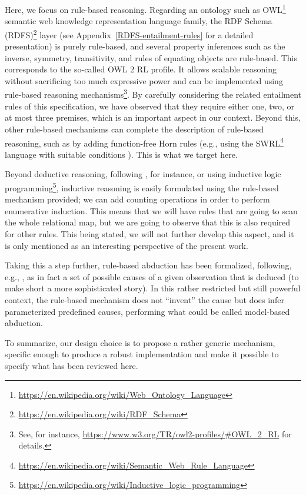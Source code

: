 \documentclass[sn-mathphys]{sn-jnl}
\newcommand{\hhref}[1]{\href{#1}{#1}}
\begin{document}
Here, we focus on rule-based reasoning. Regarding an ontology such as OWL\footnote{\url{https://en.wikipedia.org/wiki/Web_Ontology_Language}} semantic web knowledge representation language family, the RDF Schema (RDFS)\footnote{\url{https://en.wikipedia.org/wiki/RDF_Schema}} layer (see Appendix~\ref{RDFS-entailment-rules} for a detailed presentation) is purely rule-based, and several property inferences such as the inverse, symmetry, transitivity, and rules of equating objects are rule-based. This corresponds to the so-called OWL 2 RL profile. It allows scalable reasoning without sacrificing too much expressive power and can be implemented using rule-based reasoning mechanisms\footnote{See, for instance, \hhref{https://www.w3.org/TR/owl2-profiles/\#OWL_2_RL} for details.}. By carefully considering the related entailment rules of this specification, we have observed that they require either one, two, or at most three premises, which is an important aspect in our context. Beyond this, other rule-based mechanisms can complete the description of rule-based reasoning, such as by adding function-free Horn rules (e.g., using the SWRL\footnote{\hhref{https://en.wikipedia.org/wiki/Semantic_Web_Rule_Language}} language with suitable conditions \cite{motik_query_2005}). This is what we target here.

Beyond deductive reasoning, following \cite{domingos_unifying_1996}, for instance, or using inductive logic programming\footnote{\hhref{https://en.wikipedia.org/wiki/Inductive_logic_programming}}, inductive reasoning is easily formulated using the rule-based mechanism provided; we can add counting operations in order to perform enumerative induction. This means that we will have rules that are going to scan the whole relational map, but we are going to observe that this is also required for other rules. This being stated, we will not further develop this aspect, and it is only mentioned as an interesting perspective of the present work.

Taking this a step further, rule-based abduction has been formalized, following, e.g., \cite{lakkaraju_rule_2000}, as in fact a set of possible causes of a given observation that is deduced (to make short a more sophisticated story). In this rather restricted but still powerful context, the rule-based mechanism does not ``invent'' the cause but does infer parameterized predefined causes, performing what could be called model-based abduction.

To summarize, our design choice is to propose a rather generic mechanism, specific enough to produce a robust implementation and make it possible to specify what has been reviewed here.
\end{document}
